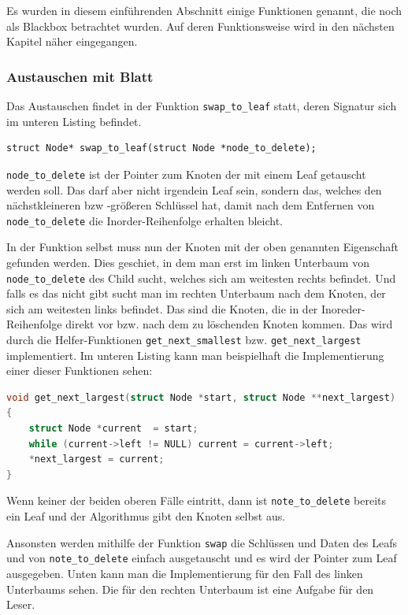 \documentclass[11pt]{article}
\newcommand{\lstin}[1]{\lstinline[language=C]{#1}}
\begin{document}
Es wurden in diesem einführenden Abschnitt einige Funktionen genannt, die noch als Blackbox
betrachtet wurden. Auf deren Funktionsweise wird in den nächsten Kapitel näher eingegangen.

\subsubsection{Austauschen mit Blatt}

Das Austauschen findet in der Funktion \lstin{swap_to_leaf} statt, deren Signatur sich im unteren Listing befindet.

\begin{lstlisting}
struct Node* swap_to_leaf(struct Node *node_to_delete);
\end{lstlisting}

\lstin{node_to_delete} ist der Pointer zum Knoten der mit einem Leaf getauscht werden soll. Das darf aber nicht irgendein Leaf sein, sondern das, welches den nächstkleineren bzw -größeren Schlüssel hat, damit
nach dem Entfernen von \lstin{node_to_delete} die Inorder-Reihenfolge erhalten bleicht.

In der Funktion selbst muss nun der Knoten mit der oben genannten Eigenschaft gefunden werden. Dies geschiet, in dem man erst im linken Unterbaum von \lstin{node_to_delete} des Child sucht, welches sich am weitesten rechts befindet.
Und falls es das nicht gibt sucht man im rechten Unterbaum nach dem Knoten, der sich am weitesten links befindet. Das sind die Knoten, die in der Inoreder-Reihenfolge direkt vor bzw. nach dem zu löschenden Knoten kommen.
Das wird durch die Helfer-Funktionen \lstin{get_next_smallest} bzw. \lstin{get_next_largest} implementiert. Im unteren Listing kann man beispielhaft die Implementierung einer dieser Funktionen sehen:

\begin{lstlisting}[language=C]
void get_next_largest(struct Node *start, struct Node **next_largest)
{
    struct Node *current  = start;
    while (current->left != NULL) current = current->left;
    *next_largest = current;
}
\end{lstlisting}

Wenn keiner der beiden oberen Fälle eintritt, dann ist \lstin{note_to_delete} bereits ein Leaf und der Algorithmus gibt den Knoten selbst aus.

Ansonsten werden mithilfe der Funktion \lstin{swap} die Schlüssen und Daten des Leafs und von \lstin{note_to_delete} einfach ausgetauscht und es wird der Pointer zum Leaf ausgegeben.
Unten kann man die Implementierung für den Fall des linken Unterbaums sehen. 
Die für den rechten Unterbaum ist eine Aufgabe für den Leser.
\end{document}
